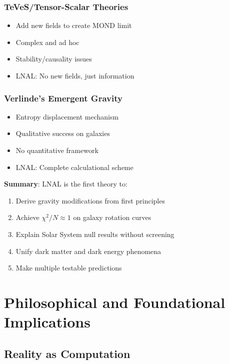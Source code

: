 \documentclass[12pt,letterpaper]{article}
\newcommand{\chisq}{\chi^2}
\begin{document}
\subsubsection{TeVeS/Tensor-Scalar Theories}
\begin{itemize}
    \item Add new fields to create MOND limit
    \item Complex and ad hoc
    \item Stability/causality issues
    \item LNAL: No new fields, just information
\end{itemize}

\subsubsection{Verlinde's Emergent Gravity}
\begin{itemize}
    \item Entropy displacement mechanism
    \item Qualitative success on galaxies
    \item No quantitative framework
    \item LNAL: Complete calculational scheme
\end{itemize}

\begin{tcolorbox}[colback=blue!5, colframe=blue!50!black]
\textbf{Summary}: LNAL is the first theory to:
\begin{enumerate}[noitemsep]
    \item Derive gravity modifications from first principles
    \item Achieve $\chisq/N \approx 1$ on galaxy rotation curves
    \item Explain Solar System null results without screening
    \item Unify dark matter and dark energy phenomena
    \item Make multiple testable predictions
\end{enumerate}
\end{tcolorbox}

\newpage

\section{Philosophical and Foundational Implications}

\subsection{Reality as Computation}
\end{document}
